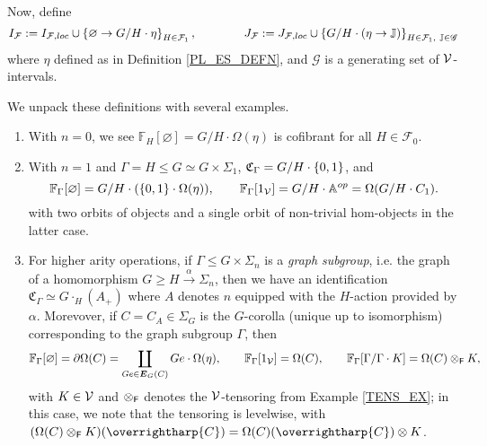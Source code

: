 \documentclass[a4paper,10pt
,draft
]{article}%
\renewcommand{\F}{\mathcal F}
\newcommand{\J}{\mathbb J}
\renewcommand{\1}{\eta}%
\newcommand{\vect}[1]{\text{\overrightharp{\ensuremath{#1}}}}
\begin{document}
Now, define
\begin{equation}
      \label{IFJF_EQ}
      I_{\F}:= I_{\F, loc} \mathbin{\cup} \set{\varnothing \to G/H \cdot \1}_{H \in \F_1},
      \qquad \qquad
      J_{\F} := J_{\F, loc} \mathbin{\cup} \set{G/H \cdot (\1 \to \J)}_{H \in \F_1,\ \J\in\mathscr{G}}
\end{equation}
where $\1$ defined as in Definition \ref{PL_ES_DEFN}, and $\mathscr{G}$ is a generating set of $\mathcal V$-intervals. 


\begin{example}
      \label{FREEOP_EX}
      We unpack these definitions with several examples.
      \begin{enumerate}[label = (\roman*)]
      \item With $n = 0$, we see $\mathbb F_H[\varnothing] = G/H \cdot \Omega(\eta)$ is cofibrant for all $H \in \mathcal F_0$.
      \item With $n = 1$ and $\Gamma = H \leq G \simeq G \times \Sigma_1$, $\mathfrak C_\Gamma = G/H \cdot \left\{0,1\right\}$, and
            \[
                  \mathbb F_{\Gamma}[\varnothing] = G/H \cdot (\left\{0,1\right\} \cdot \Omega(\eta)),
                  \qquad
                  \mathbb F_{\Gamma}[1_{\mathcal V}] = G/H \cdot \mathbb A^{op} = \Omega(G/H \cdot C_1).
            \]
            with two orbits of objects and a single orbit of non-trivial hom-objects in the latter case.
      \item For higher arity operations,
            if $\Gamma \leq G \times \Sigma_n$ is a \textit{graph subgroup}, i.e. the graph of a homomorphism $G \geq H \xrightarrow{\alpha} \Sigma_n$, then
            we have an identification $\mathfrak C_{\Gamma} \simeq G \cdot_H (A_+)$ where $A$ denotes $n$ equipped with the $H$-action provided by $\alpha$.
            Morevover, if $C = C_A \in \Sigma_G$ is the $G$-corolla (unique up to isomorphism) corresponding to the graph subgroup $\Gamma$, then
            \[
                  \mathbb F_\Gamma[\varnothing] = \partial\Omega(C) = \coprod_{Ge \in \boldsymbol{E}_G(C)} Ge \cdot \Omega(\eta),
                  \qquad
                  \mathbb F_{\Gamma}[1_{\mathcal V}] = \Omega(C),
                  \qquad
                  \mathbb F_\Gamma[\Gamma/\Gamma \cdot K] = \Omega(C) \otimes_{\mathsf{F}} K,
            \]
            with $K \in \mathcal V$ and $\otimes_{\mathsf{F}}$ denotes the $\mathcal V$-tensoring from Example \ref{TENS_EX};
            in this case, we note that the tensoring is levelwise, with
            $(\Omega(C) \otimes_\Fin K)(\vect C) = \Omega(C)(\vect C) \otimes K$.            
            

\end{enumerate}
\end{example}
\end{document}
